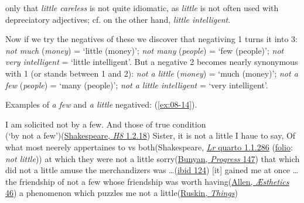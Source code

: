 \bigskip
\noindent only that \textit{little careless} is not quite idiomatic, as \textit{little} is not often used with depreciatory adjectives; cf. on the other hand, \textit{little intelligent}.

\label{ch8-not-a-little}Now if we try the negatives of these we discover that negativing 1 turns it into 3: \textit{not much} (\textit{money}) = `little (money)'; \textit{not many} (\textit{people}) = `few (people)'; \textit{not very intelligent} = `little intelligent'. But a negative 2 becomes nearly synonymous with 1 (or stands between 1 and 2): \textit{not a little} (\textit{money}) = `much (money)'; \textit{not a few} (\textit{people}) = `many (people)'; \textit{not a little intelligent} = `very intelligent'.

Examples of \textit{a few} and \textit{a little} negatived: (\ref{ex:08-14}).

\ea \label{ex:08-14}
\ea
I am solicited not by a few. And those of true condition \\(`by not a few')\hfill(\href{https://internetshakespeare.uvic.ca/doc/H8_F1/scene/1.2/index.html#tln-345}{Shakespeare, \textit{H8} 1.2.18})
\ex
Sister, it is not a little I haue to say, Of what most neerely appertaines to vs both\hfill(Shakespeare, \href{https://internetshakespeare.uvic.ca/doc/Lr_Q1/page/10/#tln-310}{\textit{Lr} quarto 1.1.286} (\href{https://internetshakespeare.uvic.ca/doc/Lr_F1/scene/1.1/index.html#tln-310}{folio}: \textit{not little})) %
\ex
at which they were not a little sorry\hfill(\href{https://archive.org/details/bunyanspilgrims00moffgoog/page/146/mode/2up?q=%22not+a+little+sorry%22&view=theater}{Bunyan, \textit{Progress} 147}) 
\ex
that which did not a little amuse the merchandizers was {\dots}\hfill(\href{https://archive.org/details/bunyanspilgrims00moffgoog/page/118/mode/2up?q=%22not+a+little%22&view=theater}{ibid 124}) %
\ex
{}[it] gained me at once {\dots} the friendship of not a few whose friendship was worth having\hfill(\href{https://archive.org/details/myfirstbookexpe00jerogoog/page/n74/mode/2up?q=%22gained+me+at+once%22&view=theater}{Allen, \textit{Æsthetics} 46}) %
\ex
a phenomenon which puzzles me not a little\hfill(\href{https://archive.org/details/in.ernet.dli.2015.264111/page/n307/mode/2up?view=theater&q=%22phenomenon+which+puzzles%22}{Ruskin, \textit{Things}}) %
\z
\z

